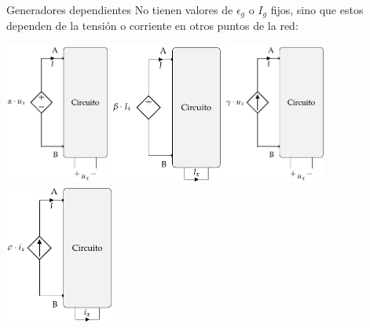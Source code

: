 \documentclass[aspectratio=169, xcolor={usenames,svgnames,dvipsnames}]{beamer}
\begin{document}

\begin{frame}{Generadores dependientes}
    No tienen valores de $\epsilon_g$ o $I_g$ fijos, sino que estos \alert{dependen de la tensión o corriente en otros puntos de la red}:
	\begin{center}
		\includegraphics[height=4.6cm]{../figs/FuenteTensionDependienteTension.pdf}\label{fig.tension-tension}\hfill
		\includegraphics[height=4.6cm]{../figs/FuenteTensionDependienteCorriente.pdf}\label{fig.tension-corriente}\hfill
		\includegraphics[height=4.6cm]{../figs/FuenteCorrienteDependienteTension.pdf}\label{fig.corriente-tension}\hfill
		\includegraphics[height=4.6cm]{../figs/FuenteCorrienteDependienteCorriente.pdf}\label{fig.corriente-corriente}
	\end{center}
\end{frame}
\end{document}
